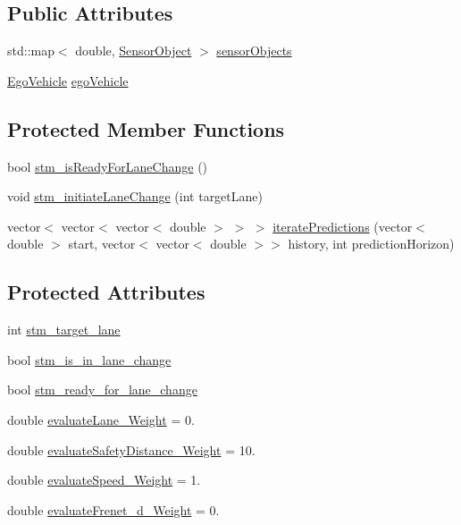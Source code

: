 \subsection*{Public Attributes}
\begin{DoxyCompactItemize}
\item 
std\+::map$<$ double, \hyperlink{classSensorObject}{Sensor\+Object} $>$ \hyperlink{classBehaviorPlanner_a0e7463db7467db3a4fe2e5eff7490d90}{sensor\+Objects}
\item 
\hyperlink{classEgoVehicle}{Ego\+Vehicle} \hyperlink{classBehaviorPlanner_a9dc8174e496e0ccf1d68bedec5b8fdb2}{ego\+Vehicle}
\end{DoxyCompactItemize}
\subsection*{Protected Member Functions}
\begin{DoxyCompactItemize}
\item 
bool \hyperlink{classBehaviorPlanner_ac3c4ecf02aa9deb5a0f955078090e3fd}{stm\+\_\+is\+Ready\+For\+Lane\+Change} ()
\item 
void \hyperlink{classBehaviorPlanner_aa4299becc244fb5f164921711da79fa5}{stm\+\_\+initiate\+Lane\+Change} (int target\+Lane)
\item 
vector$<$ vector$<$ vector$<$ double $>$ $>$ $>$ \hyperlink{classBehaviorPlanner_ae839573203455d697946581bbf58e662}{iterate\+Predictions} (vector$<$ double $>$ start, vector$<$ vector$<$ double $>$$>$ history, int prediction\+Horizon)
\end{DoxyCompactItemize}
\subsection*{Protected Attributes}
\begin{DoxyCompactItemize}
\item 
int \hyperlink{classBehaviorPlanner_a10df7163fdc6a3830a63cdf8a76b9359}{stm\+\_\+target\+\_\+lane}
\item 
bool \hyperlink{classBehaviorPlanner_aec3a75f12f6776616f4ecb275a975892}{stm\+\_\+is\+\_\+in\+\_\+lane\+\_\+change}
\item 
bool \hyperlink{classBehaviorPlanner_a78e0c9212796e8949f7f44bd34f47107}{stm\+\_\+ready\+\_\+for\+\_\+lane\+\_\+change}
\item 
double \hyperlink{classBehaviorPlanner_a13833c4fe873c4f5a85bd33fe8efc164}{evaluate\+Lane\+\_\+\+Weight} = 0.
\item 
double \hyperlink{classBehaviorPlanner_a4793519effaf8f7c72794f28a3c92147}{evaluate\+Safety\+Distance\+\_\+\+Weight} = 10.
\item 
double \hyperlink{classBehaviorPlanner_aeb4e5decdbd61adeb1e75da9d66ba34c}{evaluate\+Speed\+\_\+\+Weight} = 1.
\item 
double \hyperlink{classBehaviorPlanner_a12260fe1c642173914fc2690337ac336}{evaluate\+Frenet\+\_\+d\+\_\+\+Weight} = 0.
\end{DoxyCompactItemize}


